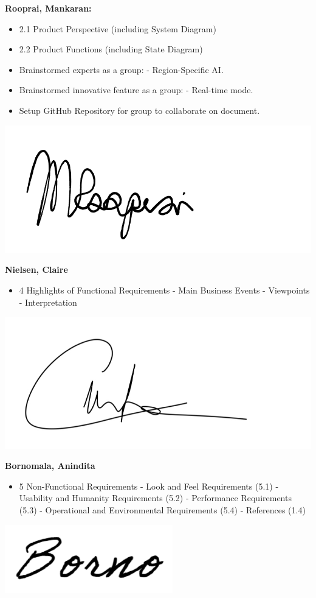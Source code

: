 \documentclass[]{article}
\begin{document}
\textbf{Rooprai, Mankaran:}
\begin{itemize}
	\item 2.1 Product Perspective (including System Diagram)
	\item 2.2 Product Functions (including State Diagram)
	\item Brainstormed experts as a group:
		\subitem - Region-Specific AI.
	\item Brainstormed innovative feature as a group:
		\subitem - Real-time mode.
  	\item Setup GitHub Repository for group to collaborate on document.
\end{itemize}
\includegraphics[scale=0.15]{mankaransignature.png}

\textbf{Nielsen, Claire}
\begin{itemize}
        \item 4 Highlights of Functional Requirements
            \subitem - Main Business Events
            \subitem - Viewpoints
            \subitem - Interpretation
\end{itemize}
\includegraphics[scale=0.15]{clairesignature.jpg}

\textbf{Bornomala, Anindita}
\begin{itemize}
        \item 5 Non-Functional Requirements
            \subitem - Look and Feel Requirements (5.1)
            \subitem - Usability and Humanity Requirements (5.2)
            \subitem - Performance Requirements (5.3)
            \subitem - Operational and Environmental Requirements (5.4)
            \subitem - References (1.4)
\end{itemize}
\includegraphics[scale=0.50]{bornosignature.png}
\end{document}
